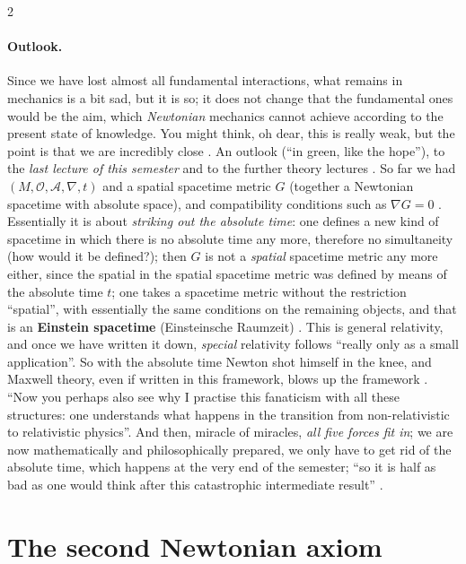 \begin{paracol}{2}
\paragraph{Outlook.} Since we have lost almost all fundamental interactions, what remains in mechanics is a bit sad, but it is so; it does not change that the fundamental ones would be the aim, which \emph{Newtonian} mechanics cannot achieve according to the present state of knowledge.
You might think, oh dear, this is really weak, but the point is that we are incredibly close . An outlook (``in green, like the hope''), to the \emph{last lecture of this semester} and to the further theory lectures .
So far we had $(M,\mathcal O,\mathcal A,\nabla,t)$ and a spatial spacetime metric $G$ (together a Newtonian spacetime with absolute space), and compatibility conditions such as $\nabla G=0$ . Essentially it is about \emph{striking out the absolute time}: one defines a new kind of
spacetime in which there is no absolute time any more, therefore no simultaneity (how would it be defined?); then $G$ is not a \emph{spatial} spacetime metric any more either, since the spatial in the spatial spacetime metric was defined by means of the absolute time $t$; one takes a spacetime metric without the
restriction ``spatial'', with essentially the same conditions on the remaining objects, and that is an \textbf{Einstein spacetime} (Einsteinsche Raumzeit) . This is general relativity, and once we have written it down, \emph{special} relativity follows
``really only as a small application''. So with the absolute time Newton shot himself in the knee, and Maxwell theory, even if written in this framework, blows up the framework . ``Now you perhaps also see why I practise this fanaticism with all these structures: one understands what happens in
the transition from non-relativistic to relativistic physics''. And then, miracle of miracles, \emph{all five forces fit in}; we are now mathematically and philosophically prepared, we only have to get rid of the absolute time, which happens at the very end of the semester; ``so it is half as bad as one would think
after this catastrophic intermediate result'' .

\section{The second Newtonian axiom}\label{sec:nd-second}


\end{paracol}

